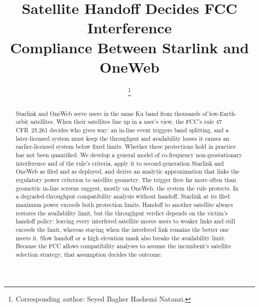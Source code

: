 \documentclass[conference]{IEEEtran}
\begin{document}
\title{Satellite Handoff Decides FCC Interference\\ Compliance Between Starlink and OneWeb}

\author{
\thanks{Corresponding author: Seyed Bagher Hashemi Natanzi.}
}

\maketitle

\begin{abstract}
Starlink and OneWeb serve users in the same Ku band from thousands of
low-Earth-orbit satellites. When their satellites line up in a user's view, the
FCC's rule 47 CFR~25.261 decides who gives way: an in-line event triggers band
splitting, and a later-licensed system must keep the throughput and availability
losses it causes an earlier-licensed system below fixed limits. Whether these
protections hold in practice has not been quantified. We develop a general model
of co-frequency non-geostationary interference and of the rule's criteria, apply
it to second-generation Starlink and OneWeb as filed and as deployed, and derive
an analytic approximation that links the regulatory power criterion to satellite
geometry. The trigger fires far more often than geometric in-line screens
suggest, mostly on OneWeb, the system the rule protects. In a degraded-throughput
compatibility analysis without handoff, Starlink at its filed maximum power
exceeds both protection limits. Handoff to
another satellite always restores the availability limit, but the throughput
verdict depends on the victim's handoff policy: leaving every interfered
satellite moves users to weaker links and still exceeds the limit, whereas
staying when the interfered link remains the better one meets it. Slow handoff
or a high elevation mask also breaks the availability limit. Because the FCC allows
compatibility analyses to assume the incumbent's satellite selection strategy,
that assumption decides the outcome.
\end{abstract}
\end{document}
